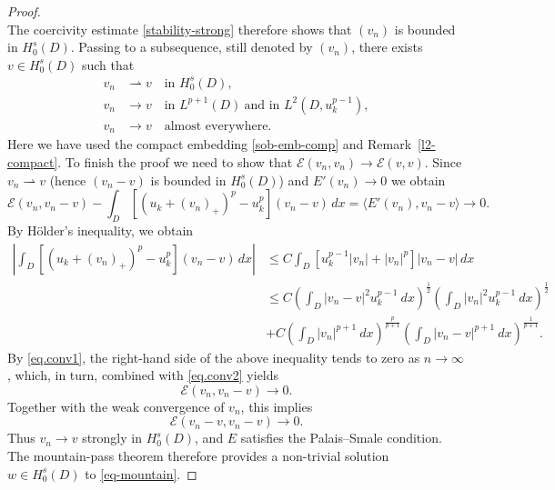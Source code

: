 \documentclass[11pt,a4paper,reqno]{amsart}
\theoremstyle{definition}
\numberwithin{equation}{section}
\begin{document}
\begin{proof}
\[\]
The coercivity estimate \eqref{stability-strong} therefore shows that \((v_n)\) 
is bounded in \(H_0^s(D)\). 
Passing to a subsequence, still denoted by \((v_n)\), there exists \(v\in H_0^s(D)\) such that
\begin{equation}
\label{eq.conv1}
\begin{split}
v_n&\rightharpoonup v\quad\text{in } H^s_0(D), \\
v_n&\to v\quad\text{in }L^{p+1}(D)\ \text{and in } L^2(D,u_k^{p-1}),\\
v_n&\to v\quad\text{almost everywhere}.
\end{split}
\end{equation}
Here we have used the compact embedding \eqref{sob-emb-comp} and Remark~\ref{l2-compact}.
To finish the proof we need to show that $\mathcal E(v_n,v_n)\to\mathcal E(v,v)$. 
Since $v_n\rightharpoonup v$ (hence \((v_n-v)\) is bounded in \(H_0^s(D)\)) and $E'(v_n)\to0$ we obtain
\begin{equation}
\label{eq.conv2}
\mathcal{E}(v_n,v_n-v)-\int_D \left[(u_k+(v_n)_+)^p-u_k^p\right](v_n-v)\,dx=\langle E'(v_n),v_n-v\rangle\to0.
\end{equation}
By H\"older's inequality, we obtain
\begin{align*}
\left|\int_D \left[(u_k+(v_n)_+)^p-u_k^p\right](v_n-v)\,dx\right|&\le C\int_D \left[u_k^{p-1}|v_n|+|v_n|^p\right]|v_n-v|\,dx\\
&\le C\left(\int_D|v_n-v|^2u_k^{p-1}\ dx\right)^{\frac{1}{2}}\left(\int_D|v_n|^2u_k^{p-1}\ dx\right)^{\frac{1}{2}}\\
&+C\left(\int_D|v_n|^{p+1}\ dx\right)^{\frac{p}{p+1}}\left(\int_D|v_n-v|^{p+1}\ dx\right)^{\frac{1}{p+1}}.
\end{align*}
By \eqref{eq.conv1}, the right-hand side of the above inequality tends to zero as $n\to\infty$,
which, in turn, combined with \eqref{eq.conv2} yields 
\[
\mathcal E(v_n,v_n-v)\longrightarrow0. 
\]
Together with the weak convergence of \(v_n\), this implies 
\[
\mathcal E(v_n-v,v_n-v)\longrightarrow0. 
\]
Thus \(v_n\to v\) strongly in \(H_0^s(D)\), and \(E\) satisfies the Palais--Smale condition.
The mountain-pass theorem therefore provides a non-trivial solution \(w\in H_0^s(D)\) to \eqref{eq-mountain}.
\end{proof}
\end{document}
